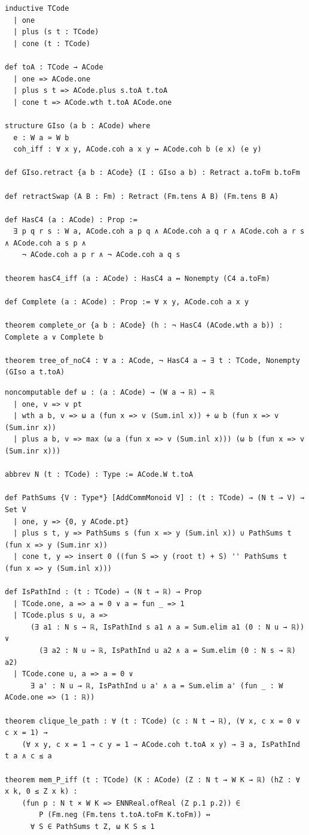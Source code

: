 \label{lean:tree-of-noc4}
\begin{lstlisting}
inductive TCode
  | one
  | plus (s t : TCode)
  | cone (t : TCode)

def toA : TCode → ACode
  | one => ACode.one
  | plus s t => ACode.plus s.toA t.toA
  | cone t => ACode.wth t.toA ACode.one

structure GIso (a b : ACode) where
  e : W a ≃ W b
  coh_iff : ∀ x y, ACode.coh a x y ↔ ACode.coh b (e x) (e y)

def GIso.retract {a b : ACode} (I : GIso a b) : Retract a.toFm b.toFm

def retractSwap (A B : Fm) : Retract (Fm.tens A B) (Fm.tens B A)

def HasC4 (a : ACode) : Prop :=
  ∃ p q r s : W a, ACode.coh a p q ∧ ACode.coh a q r ∧ ACode.coh a r s ∧ ACode.coh a s p ∧
    ¬ ACode.coh a p r ∧ ¬ ACode.coh a q s

theorem hasC4_iff (a : ACode) : HasC4 a ↔ Nonempty (C4 a.toFm)

def Complete (a : ACode) : Prop := ∀ x y, ACode.coh a x y

theorem complete_or {a b : ACode} (h : ¬ HasC4 (ACode.wth a b)) : Complete a ∨ Complete b

theorem tree_of_noC4 : ∀ a : ACode, ¬ HasC4 a → ∃ t : TCode, Nonempty (GIso a t.toA)
\end{lstlisting}

\label{lean:mem-p-iff}
\begin{lstlisting}
noncomputable def ω : (a : ACode) → (W a → ℝ) → ℝ
  | one, v => v pt
  | wth a b, v => ω a (fun x => v (Sum.inl x)) + ω b (fun x => v (Sum.inr x))
  | plus a b, v => max (ω a (fun x => v (Sum.inl x))) (ω b (fun x => v (Sum.inr x)))

abbrev N (t : TCode) : Type := ACode.W t.toA

def PathSums {V : Type*} [AddCommMonoid V] : (t : TCode) → (N t → V) → Set V
  | one, y => {0, y ACode.pt}
  | plus s t, y => PathSums s (fun x => y (Sum.inl x)) ∪ PathSums t (fun x => y (Sum.inr x))
  | cone t, y => insert 0 ((fun S => y (root t) + S) '' PathSums t (fun x => y (Sum.inl x)))

def IsPathInd : (t : TCode) → (N t → ℝ) → Prop
  | TCode.one, a => a = 0 ∨ a = fun _ => 1
  | TCode.plus s u, a =>
      (∃ a1 : N s → ℝ, IsPathInd s a1 ∧ a = Sum.elim a1 (0 : N u → ℝ)) ∨
        (∃ a2 : N u → ℝ, IsPathInd u a2 ∧ a = Sum.elim (0 : N s → ℝ) a2)
  | TCode.cone u, a => a = 0 ∨
      ∃ a' : N u → ℝ, IsPathInd u a' ∧ a = Sum.elim a' (fun _ : W ACode.one => (1 : ℝ))

theorem clique_le_path : ∀ (t : TCode) (c : N t → ℝ), (∀ x, c x = 0 ∨ c x = 1) →
    (∀ x y, c x = 1 → c y = 1 → ACode.coh t.toA x y) → ∃ a, IsPathInd t a ∧ c ≤ a

theorem mem_P_iff (t : TCode) (K : ACode) (Z : N t → W K → ℝ) (hZ : ∀ x k, 0 ≤ Z x k) :
    (fun p : N t × W K => ENNReal.ofReal (Z p.1 p.2)) ∈
        P (Fm.neg (Fm.tens t.toA.toFm K.toFm)) ↔
      ∀ S ∈ PathSums t Z, ω K S ≤ 1
\end{lstlisting}

